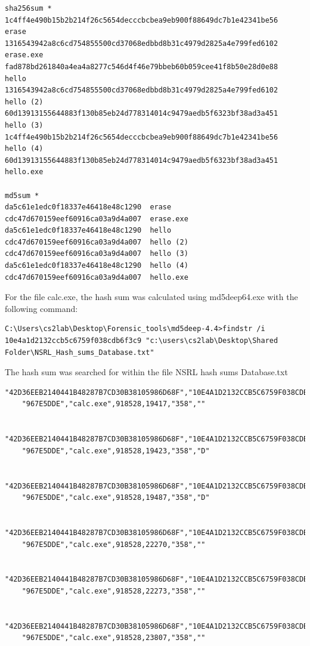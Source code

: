\documentclass[a4paper,10pt,oneside]{article}
\begin{document}
\begin{lstlisting}[caption= Result of sha256 and md5sum]
sha256sum *
1c4ff4e490b15b2b214f26c5654decccbcbea9eb900f88649dc7b1e42341be56  erase
1316543942a8c6cd754855500cd37068edbbd8b31c4979d2825a4e799fed6102  erase.exe
fad878bd261840a4ea4a8277c546d4f46e79bbeb60b059cee41f8b50e28d0e88  hello
1316543942a8c6cd754855500cd37068edbbd8b31c4979d2825a4e799fed6102  hello (2)
60d13913155644883f130b85eb24d778314014c9479aedb5f6323bf38ad3a451  hello (3)
1c4ff4e490b15b2b214f26c5654decccbcbea9eb900f88649dc7b1e42341be56  hello (4)
60d13913155644883f130b85eb24d778314014c9479aedb5f6323bf38ad3a451  hello.exe

md5sum *
da5c61e1edc0f18337e46418e48c1290  erase
cdc47d670159eef60916ca03a9d4a007  erase.exe
da5c61e1edc0f18337e46418e48c1290  hello
cdc47d670159eef60916ca03a9d4a007  hello (2)
cdc47d670159eef60916ca03a9d4a007  hello (3)
da5c61e1edc0f18337e46418e48c1290  hello (4)
cdc47d670159eef60916ca03a9d4a007  hello.exe
\end{lstlisting}

For the file calc.exe, the hash sum was calculated using md5deep64.exe with the following command:

\begin{lstlisting}[caption= Command for md5deep64.exe]
	C:\Users\cs2lab\Desktop\Forensic_tools\md5deep-4.4>findstr /i 10e4a1d2132ccb5c6759f038cdb6f3c9 "c:\users\cs2lab\Desktop\Shared Folder\NSRL_Hash_sums_Database.txt"
\end{lstlisting}

The hash sum was searched for within the file
NSRL\textunderscore
hash\textunderscore
sums\textunderscore
Database.txt
\newpage
\begin{lstlisting}[caption= Result for findstr]
	"42D36EEB2140441B48287B7CD30B38105986D68F","10E4A1D2132CCB5C6759F038CDB6F3C9",
	"967E5DDE","calc.exe",918528,19417,"358",""

	"42D36EEB2140441B48287B7CD30B38105986D68F","10E4A1D2132CCB5C6759F038CDB6F3C9",
	"967E5DDE","calc.exe",918528,19423,"358","D"

	"42D36EEB2140441B48287B7CD30B38105986D68F","10E4A1D2132CCB5C6759F038CDB6F3C9",
	"967E5DDE","calc.exe",918528,19487,"358","D"

	"42D36EEB2140441B48287B7CD30B38105986D68F","10E4A1D2132CCB5C6759F038CDB6F3C9",
	"967E5DDE","calc.exe",918528,22270,"358",""

	"42D36EEB2140441B48287B7CD30B38105986D68F","10E4A1D2132CCB5C6759F038CDB6F3C9",
	"967E5DDE","calc.exe",918528,22273,"358",""

	"42D36EEB2140441B48287B7CD30B38105986D68F","10E4A1D2132CCB5C6759F038CDB6F3C9",
	"967E5DDE","calc.exe",918528,23807,"358",""
\end{lstlisting}
\end{document}
